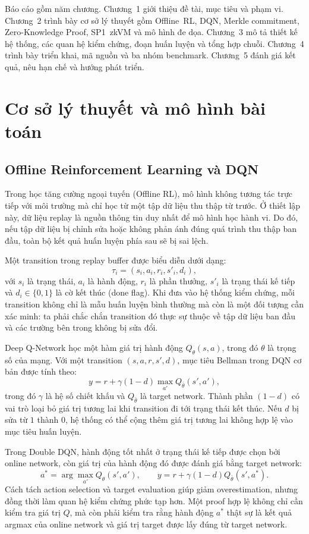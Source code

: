 \documentclass[12pt,a4paper,oneside]{report}
\begin{document}
Báo cáo gồm năm chương. Chương~1 giới thiệu đề tài, mục tiêu và phạm vi. Chương~2 trình bày cơ sở lý thuyết gồm Offline~RL, DQN, Merkle commitment, Zero-Knowledge Proof, SP1~zkVM và mô hình đe dọa. Chương~3 mô tả thiết kế hệ thống, các quan hệ kiểm chứng, đoạn huấn luyện và tổng hợp chuỗi. Chương~4 trình bày triển khai, mã nguồn và ba nhóm benchmark. Chương~5 đánh giá kết quả, nêu hạn chế và hướng phát triển.

\chapter{Cơ sở lý thuyết và mô hình bài toán}

\section{Offline Reinforcement Learning và DQN}

Trong học tăng cường ngoại tuyến (Offline RL), mô hình không tương tác trực tiếp với môi trường mà chỉ học từ một tập dữ liệu thu thập từ trước. Ở thiết lập này, dữ liệu replay là nguồn thông tin duy nhất để mô hình học hành vi. Do đó, nếu tập dữ liệu bị chỉnh sửa hoặc không phản ánh đúng quá trình thu thập ban đầu, toàn bộ kết quả huấn luyện phía sau sẽ bị sai lệch.

Một transition trong replay buffer được biểu diễn dưới dạng:
\[
\tau_i = (s_i, a_i, r_i, s'_i, d_i),
\]
với \(s_i\) là trạng thái, \(a_i\) là hành động, \(r_i\) là phần thưởng, \(s'_i\) là trạng thái kế tiếp và \(d_i \in \{0,1\}\) là cờ kết thúc (done flag). Khi đưa vào hệ thống kiểm chứng, mỗi transition không chỉ là mẫu huấn luyện bình thường mà còn là một đối tượng cần xác minh: ta phải chắc chắn transition đó thực sự thuộc về tập dữ liệu ban đầu và các trường bên trong không bị sửa đổi.

Deep Q-Network học một hàm giá trị hành động \(Q_\theta(s,a)\), trong đó \(\theta\) là trọng số của mạng. Với một transition \((s,a,r,s',d)\), mục tiêu Bellman trong DQN cơ bản được tính theo:
\[
y = r + \gamma(1-d)\max_{a'} Q_{\bar{\theta}}(s',a'),
\]
trong đó \(\gamma\) là hệ số chiết khấu và \(Q_{\bar{\theta}}\) là target network. Thành phần \((1-d)\) có vai trò loại bỏ giá trị tương lai khi transition đi tới trạng thái kết thúc. Nếu \(d\) bị sửa từ \(1\) thành \(0\), hệ thống có thể cộng thêm giá trị tương lai không hợp lệ vào mục tiêu huấn luyện.

Trong Double DQN, hành động tốt nhất ở trạng thái kế tiếp được chọn bởi online network, còn giá trị của hành động đó được đánh giá bằng target network:
\[
a^* = \arg\max_{a'} Q_{\theta}(s',a'),
\qquad
y = r + \gamma(1-d)Q_{\bar{\theta}}(s',a^*).
\]
Cách tách action selection và target evaluation giúp giảm overestimation, nhưng đồng thời làm quan hệ kiểm chứng phức tạp hơn. Một proof hợp lệ không chỉ cần kiểm tra giá trị \(Q\), mà còn phải kiểm tra rằng hành động \(a^*\) thật sự là kết quả argmax của online network và giá trị target được lấy đúng từ target network.
\end{document}
